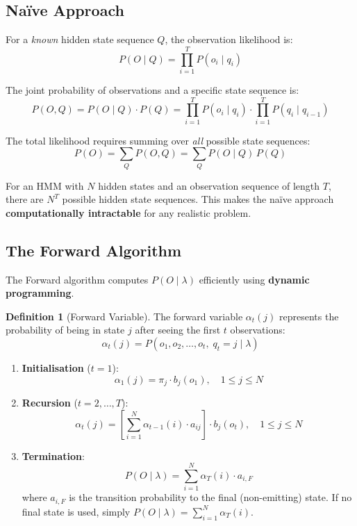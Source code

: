 \documentclass[11pt,a4paper]{article}
\theoremstyle{definition}
\newtheorem{definition}{Definition}[section]
\theoremstyle{plain}
\theoremstyle{remark}
\begin{document}
\subsection{Na\"ive Approach}

For a \emph{known} hidden state sequence $Q$, the observation likelihood is:
\[
P(O \mid Q) = \prod_{i=1}^{T} P(o_i \mid q_i)
\]

The joint probability of observations and a specific state sequence is:
\[
P(O, Q) = P(O \mid Q) \cdot P(Q) = \prod_{i=1}^{T} P(o_i \mid q_i) \cdot \prod_{i=1}^{T} P(q_i \mid q_{i-1})
\]

The total likelihood requires summing over \emph{all} possible state sequences:
\[
P(O) = \sum_{Q} P(O, Q) = \sum_{Q} P(O \mid Q) \, P(Q)
\]

\begin{tcolorbox}[colback=red!5!white,colframe=red!75!black,title=\textbf{Complexity Problem}]
For an HMM with $N$ hidden states and an observation sequence of length $T$, there are $N^T$ possible hidden state sequences. This makes the na\"ive approach \textbf{computationally intractable} for any realistic problem.
\end{tcolorbox}

\subsection{The Forward Algorithm}

The Forward algorithm computes $P(O \mid \lambda)$ efficiently using \textbf{dynamic programming}.

\begin{definition}[Forward Variable]
The forward variable $\alpha_t(j)$ represents the probability of being in state $j$ after seeing the first $t$ observations:
\[
\alpha_t(j) = P(o_1, o_2, \dots, o_t, \; q_t = j \mid \lambda)
\]
\end{definition}

\begin{tcolorbox}[colback=cyan!5!white,colframe=cyan!75!black,title=\textbf{Forward Algorithm}]
\begin{enumerate}
    \item \textbf{Initialisation} ($t = 1$):
    \[
    \alpha_1(j) = \pi_j \cdot b_j(o_1), \quad 1 \leq j \leq N
    \]

    \item \textbf{Recursion} ($t = 2, \dots, T$):
    \[
    \alpha_t(j) = \left[ \sum_{i=1}^{N} \alpha_{t-1}(i) \cdot a_{ij} \right] \cdot b_j(o_t), \quad 1 \leq j \leq N
    \]

    \item \textbf{Termination}:
    \[
    P(O \mid \lambda) = \sum_{i=1}^{N} \alpha_T(i) \cdot a_{i,F}
    \]
    where $a_{i,F}$ is the transition probability to the final (non-emitting) state. If no final state is used, simply $P(O \mid \lambda) = \sum_{i=1}^{N} \alpha_T(i)$.
\end{enumerate}
\end{tcolorbox}
\end{document}
